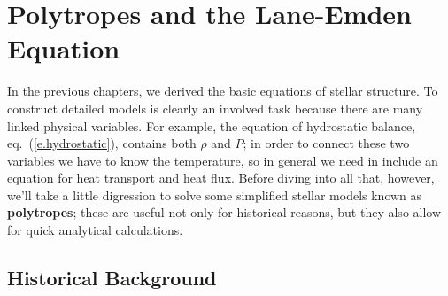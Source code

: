 \chapter[Polytropes]{Polytropes and the Lane-Emden Equation}
\label{ch.polytropes}

In the previous chapters, we derived the basic equations of stellar structure. To construct detailed models is clearly an involved task because there are many linked physical variables. For example, the equation of hydrostatic balance, eq.~(\ref{e.hydrostatic}), contains both $\rho$ and $P$; in order to connect these two variables we have to know the temperature, so in general we need in include an equation for heat transport and heat flux. Before diving into all that, however, we'll take a little digression to solve some simplified stellar models known as \textbf{polytropes}; these are useful not only for historical reasons, but they also allow for quick analytical calculations.

\section{Historical Background}\label{s.LE-background}

